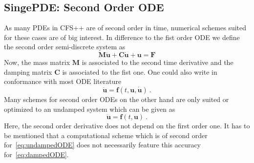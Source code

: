 \subsection{SingePDE: Second Order ODE}
As many PDEs in CFS++ are of second order in time, numerical schemes suited for these cases are of
big interest. In difference to the fist order ODE we define the second order semi-discrete system as
\begin{equation}
\mathbf{M} \mathbf{\ddot{u}} + \mathbf{C} \mathbf{\dot{u}} + \mathbf{u} = \mathbf{F}
\end{equation}
Now, the mass matrix $\mathbf{M}$ is associated to the second time derivative and the damping matrix
$\mathbf{C}$ is associated to the fist one. One could also write in conformance with most ODE literature
\begin{equation}\label{eq:dampedODE}
\mathbf{\ddot{u}} = \mathbf{f}(t,\mathbf{u},\mathbf{\dot{u}})\ .
\end{equation}
Many schemes for second order ODEs on the other hand are only suited or optimized to an undamped
system which can be given as
\begin{equation}\label{eq:undampedODE} 
\mathbf{\ddot{u}} = \mathbf{f}(t,\mathbf{u})\ .
\end{equation}
Here, the second order derivative does not depend on the first order one. It has to be mentioned
that a computational scheme which is of second order for~\eqref{eq:undampedODE} does not necessarily feature this
accuracy for~\eqref{eq:dampedODE}.
